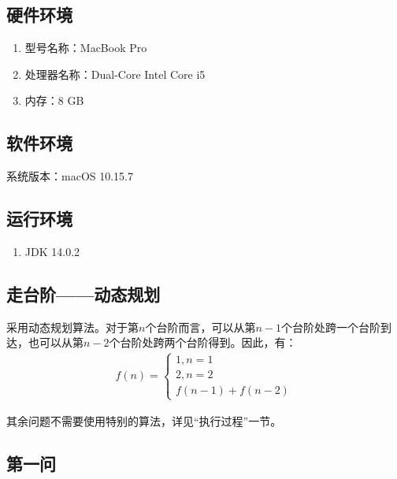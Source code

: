 \documentclass[11pt]{homework}
\begin{document}
\maketitle


  \subsection*{硬件环境}
  \begin{enumerate}
    \item 型号名称：MacBook Pro
    \item 处理器名称：Dual-Core Intel Core i5
    \item 内存：8 GB
  \end{enumerate}

  \subsection*{软件环境}

  系统版本：macOS 10.15.7

  \subsection*{运行环境}

  \begin{enumerate}
    \item JDK 14.0.2
  \end{enumerate}


\subsection*{走台阶——动态规划}
采用动态规划算法。对于第$n$个台阶而言，可以从第$n - 1$个台阶处跨一个台阶到达，也可以从第$n - 2$个台阶处跨两个台阶得到。因此，有：
\begin{gather*}
  f(n) = \begin{cases}
    1, n = 1\\
    2, n = 2\\
    f(n - 1) + f(n - 2)
  \end{cases}
\end{gather*}

其余问题不需要使用特别的算法，详见“执行过程”一节。


\subsection*{第一问}
\end{document}
